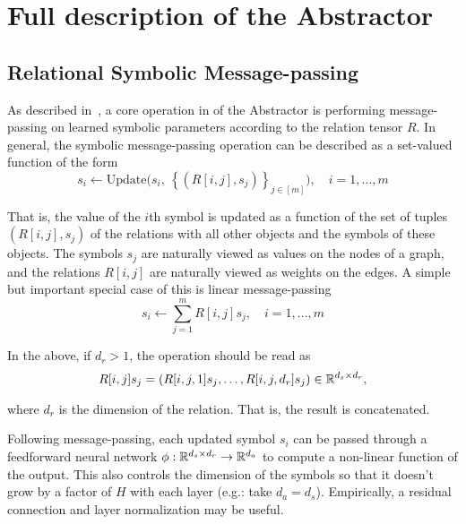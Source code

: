 
\def\m{m}

\section{Full description of the Abstractor}\label{sec:message_passing_supplement} %

\subsection{Relational Symbolic Message-passing}

As described in~, a core operation in of the Abstractor is performing message-passing on learned symbolic parameters according to the relation tensor $R$. In general, the symbolic message-passing operation can be described as a set-valued function of the form
\begin{equation}
    \label{eq:symbolic_message_passing_supp}
    s_i \leftarrow \text{Update}\Big( s_i, \ \left\{ \left(R[i,j], s_j\right)\right\}_{j\in[m]}\Big), \quad i = 1, \ldots, m
\end{equation}

That is, the value of the $i$th symbol is updated as a function of the set of tuples $(R[i,j], s_j)$ of the relations with all other objects and the symbols of these objects. The symbols $s_j$ are naturally viewed as values on the nodes of a graph, and the relations $R[i,j]$ are naturally viewed as weights on the edges. A simple but important special case of this is linear message-passing
\begin{equation}
    \label{eq:linear_symbolic_mp:supp}
    s_i \leftarrow \sum_{j=1}^{m} R[i,j] s_j, \quad i=1, \ldots, m
\end{equation}

In the above, if $d_r > 1$, the operation should be read as
\begin{equation*}
    R[i,j] s_j = \left( R[i,j,1] s_j, \ldots, R[i,j, d_r] s_j \right) \in \mathbb{R}^{d_s \times d_r},
\end{equation*}

where $d_r$ is the dimension of the relation. That is, the result is concatenated.

Following message-passing, each updated symbol $s_i$ can be passed through a feedforward neural network $\phi: \mathbb{R}^{d_s \times d_r} \rightarrow \mathbb{R}^{d_a}$ to compute a non-linear function of the output. This also controls the dimension of the symbols so that it doesn't grow by a factor of $H$ with each layer (e.g.: take $d_a = d_s$). Empirically, a residual connection and layer normalization may be useful.

